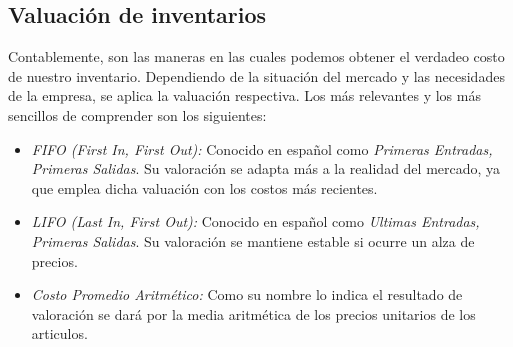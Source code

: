 \documentclass[letterpaper, 12pt]{article}
\begin{document}
    \subsection*{Valuación de inventarios}
    \justify
    Contablemente, son las maneras en las cuales podemos obtener el verdadeo costo de nuestro inventario. Dependiendo de la situación del mercado y las necesidades de la empresa, se aplica la valuación respectiva. Los más relevantes y los más sencillos
    de comprender son los siguientes:
    \begin{itemize}
        \item \emph{FIFO (First In, First Out):} Conocido en español como \emph{Primeras Entradas, Primeras Salidas}. Su valoración se adapta más a la realidad del mercado, ya que emplea dicha valuación con los costos más recientes.
        \item \emph{LIFO (Last In, First Out):} Conocido en español como \emph{Ultimas Entradas, Primeras Salidas}. Su valoración se mantiene estable si ocurre un alza de precios.
        \item \emph{Costo Promedio Aritmético: } Como su nombre lo indica el resultado de valoración se dará por la media aritmética de los precios unitarios de los articulos.
    \end{itemize}
    
    \newpage
\end{document}
